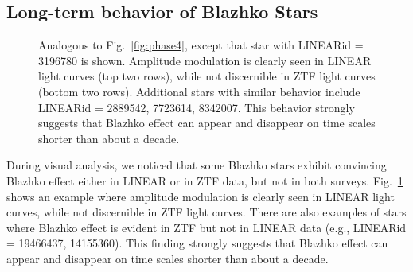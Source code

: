 \subsection{Long-term behavior of Blazhko Stars}

\begin{figure}[ht]
    \centering
    \caption{Analogous to Fig.~\ref{fig:phase4}, except that star
    with LINEARid = 3196780 is shown. Amplitude modulation is clearly
    seen in LINEAR light curves (top two rows), while not discernible
    in ZTF light curves (bottom two rows). Additional stars with
    similar behavior include LINEARid = 2889542, 7723614, 8342007.
    This behavior strongly  suggests that Blazhko effect can appear and disappear on time scales shorter than
      about a decade.
      }
      \label{fig:phase6}
\end{figure}


During visual analysis, we noticed that some Blazhko stars exhibit
convincing Blazhko effect either in LINEAR or in ZTF data, but not in
both surveys. Fig.~\ref{fig:phase6} shows an example where amplitude
modulation is clearly seen in LINEAR light curves, while not discernible
in ZTF light curves.  There are also examples of stars where Blazhko effect is evident in
ZTF but not in LINEAR data (e.g., LINEARid = 19466437, 14155360). 
This finding  strongly suggests that Blazhko effect can appear and disappear on time scales shorter than
about a decade.

 